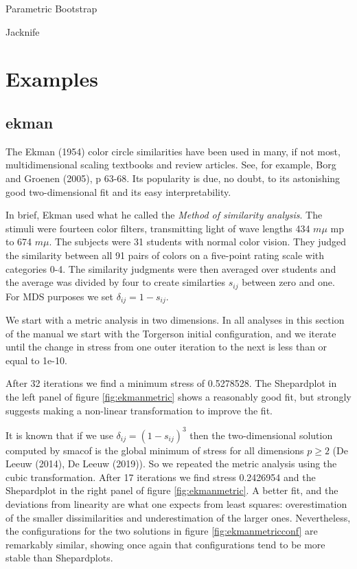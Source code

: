 \documentclass[
  12pt,
]{article}
\begin{document}
Parametric Bootstrap

Jacknife

\section{Examples}\label{examples}

\subsection{ekman}\label{ekman}

The Ekman (1954) color circle similarities have been used in many, if not most, multidimensional scaling textbooks and review articles. See, for example,
Borg and Groenen (2005), p 63-68. Its popularity is due, no doubt,
to its astonishing good two-dimensional fit and its easy interpretability.

In brief, Ekman used what he called the \emph{Method of similarity analysis}. The stimuli
were fourteen color filters, transmitting light of wave lengths 434 \(m\mu\) mp to 674 \(m\mu\). The subjects were 31 students with normal color vision. They judged
the similarity between all 91 pairs of colors on a five-point rating scale
with categories 0-4. The similarity judgments were then averaged over students
and the average was divided by four to create similarties \(s_{ij}\) between zero
and one. For MDS purposes we set \(\delta_{ij}=1-s_{ij}\).

We start with a metric analysis in two dimensions. In all analyses in this section of the manual we start with the Torgerson initial configuration, and we iterate until the change in stress from one outer iteration to the next is less than or equal to 1e-10.

After 32 iterations we find a minimum stress of 0.5278528. The Shepardplot in the left panel of figure \ref{fig:ekmanmetric} shows a reasonably
good fit, but strongly suggests making a non-linear transformation to improve the fit.

It is known that if we use \(\delta_{ij}=(1-s_{ij})^3\) then the two-dimensional solution computed by smacof is the
global minimum of stress for all dimensions \(p\geq 2\) (De Leeuw (2014), De Leeuw (2019)). So we repeated the metric analysis using the cubic transformation.
After 17 iterations we find stress 0.2426954 and the Shepardplot in the right panel of figure \ref{fig:ekmanmetric}. A better fit, and
the deviations from linearity are what one expects from least squares: overestimation
of the smaller dissimilarities and underestimation of the larger ones. Nevertheless,
the configurations for the two solutions in figure \ref{fig:ekmanmetricconf} are remarkably similar, showing once again that configurations tend to be more stable than Shepardplots.
\end{document}
